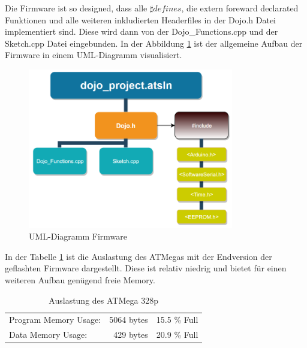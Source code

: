 \newpage
Die Firmware ist so designed, dass alle $\sharp defines$, die extern foreward declarated Funktionen und alle weiteren inkludierten Headerfiles in der Dojo.h Datei implementiert sind. Diese wird dann von der Dojo\_Functions.cpp und der Sketch.cpp Datei eingebunden. In der Abbildung \ref{fig:uml_diagramm} ist der allgemeine Aufbau der Firmware in einem UML-Diagramm visualisiert.\\
\begin{figure}[H]
\centering
\includegraphics[width=0.8\textwidth]{Bilder/uml_diagramm.PNG} 
\caption{UML-Diagramm Firmware}
\label{fig:uml_diagramm}
\end{figure}
In der Tabelle \ref{tab:auslastung} ist die Auslastung des ATMegas mit der Endversion der geflashten Firmware dargestellt. Diese ist relativ niedrig und bietet für einen weiteren Aufbau genügend freie Memory.\\
\begin{table}[H]
\centering
\begin{tabular}{|l|r|r|}
\hline 
Program Memory Usage: & 5064 bytes & 15.5 \% Full \\ 
Data Memory Usage: & 429 bytes & 20.9 \% Full \\ 
\hline 
\end{tabular} 
\caption{Auslastung des ATMega 328p}
\label{tab:auslastung}
\end{table}
\newpage

